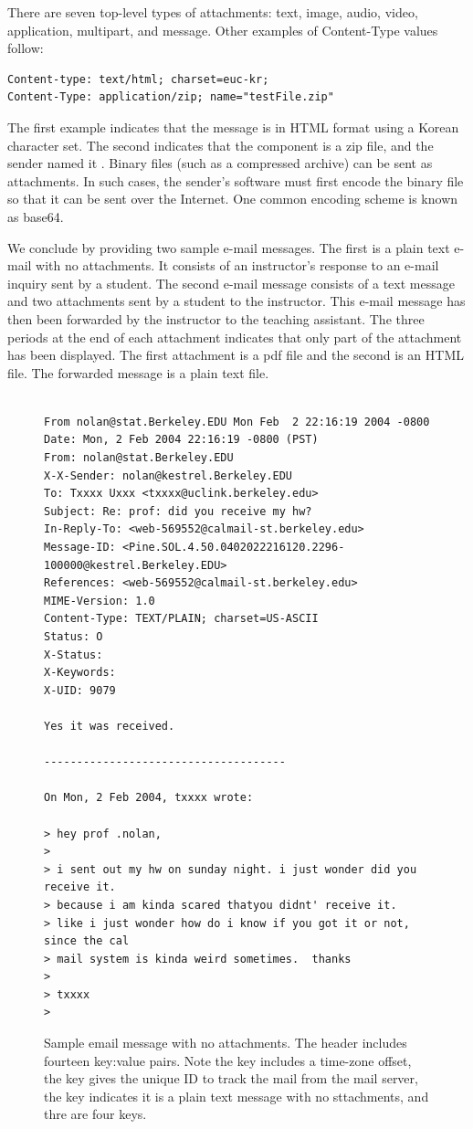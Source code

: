There are seven top-level types of attachments: text, image, audio, video, application,
multipart, and message.  Other examples of Content-Type values follow:

\begin{verbatim}
Content-type: text/html; charset=euc-kr;
Content-Type: application/zip; name="testFile.zip"
\end{verbatim}
The first example indicates that the message is in HTML format using a
Korean character set.  The second indicates that the component
is a zip file, and the sender named it .
Binary files (such as a compressed archive) can be
sent as attachments. 
In such cases, the sender's software must first encode the binary
file so that it can be sent over the Internet. 
One common encoding scheme is known as base64. 

We conclude by providing two sample e-mail messages.
The first is a plain text e-mail with no
attachments.  It consists of an instructor's response
to an e-mail inquiry sent by a student. 
The second e-mail message consists of a text message and two attachments 
sent by a student to the instructor. This e-mail message has then been 
forwarded by the instructor to the teaching assistant.
The three periods at the end of each attachment indicates
that only part of the attachment has been displayed.
The first attachment is a pdf file and the second is an HTML file.
The forwarded message is a plain text file.

\begin{figure}

{\small{
\begin{verbatim}
 
From nolan@stat.Berkeley.EDU Mon Feb  2 22:16:19 2004 -0800
Date: Mon, 2 Feb 2004 22:16:19 -0800 (PST)
From: nolan@stat.Berkeley.EDU
X-X-Sender: nolan@kestrel.Berkeley.EDU
To: Txxxx Uxxx <txxxx@uclink.berkeley.edu>
Subject: Re: prof: did you receive my hw?
In-Reply-To: <web-569552@calmail-st.berkeley.edu>
Message-ID: <Pine.SOL.4.50.0402022216120.2296-100000@kestrel.Berkeley.EDU>
References: <web-569552@calmail-st.berkeley.edu>
MIME-Version: 1.0
Content-Type: TEXT/PLAIN; charset=US-ASCII
Status: O
X-Status:
X-Keywords:
X-UID: 9079
  
Yes it was received.
 
-------------------------------------
 
On Mon, 2 Feb 2004, txxxx wrote:
 
> hey prof .nolan,
>
> i sent out my hw on sunday night. i just wonder did you receive it.
> because i am kinda scared thatyou didnt' receive it.
> like i just wonder how do i know if you got it or not, since the cal
> mail system is kinda weird sometimes.  thanks
>
> txxxx
>
\end{verbatim}    
} }
\caption{Sample email message with no attachments. The header includes fourteen
key:value pairs.  Note the  key includes a time-zone offset,
the  key gives the unique ID to track the
mail from the  mail server,
the  key indicates it is a plain text message
with no sttachments, and thre are four  keys.}\label{fig:simpleEmail}
\end{figure}



